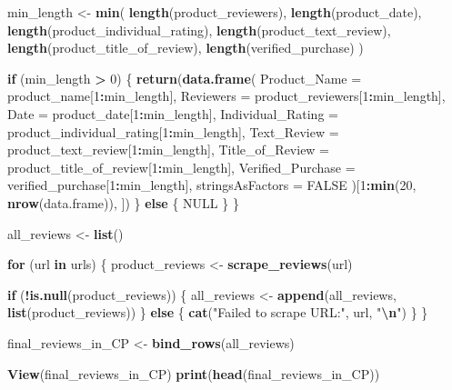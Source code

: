 \documentclass[
  11pt,
]{article}
\newenvironment{Shaded}{\begin{snugshade}}{\end{snugshade}}
\newcommand{\AttributeTok}[1]{\textcolor[rgb]{0.13,0.29,0.53}{#1}}
\newcommand{\ConstantTok}[1]{\textcolor[rgb]{0.56,0.35,0.01}{#1}}
\newcommand{\ControlFlowTok}[1]{\textcolor[rgb]{0.13,0.29,0.53}{\textbf{#1}}}
\newcommand{\DecValTok}[1]{\textcolor[rgb]{0.00,0.00,0.81}{#1}}
\newcommand{\FunctionTok}[1]{\textcolor[rgb]{0.13,0.29,0.53}{\textbf{#1}}}
\newcommand{\NormalTok}[1]{#1}
\newcommand{\OtherTok}[1]{\textcolor[rgb]{0.56,0.35,0.01}{#1}}
\newcommand{\SpecialCharTok}[1]{\textcolor[rgb]{0.81,0.36,0.00}{\textbf{#1}}}
\newcommand{\StringTok}[1]{\textcolor[rgb]{0.31,0.60,0.02}{#1}}
\begin{document}
\begin{Shaded}
\begin{Highlighting}[]
\NormalTok{  min\_length }\OtherTok{\textless{}{-}} \FunctionTok{min}\NormalTok{(}
    \FunctionTok{length}\NormalTok{(product\_reviewers),}
    \FunctionTok{length}\NormalTok{(product\_date),}
    \FunctionTok{length}\NormalTok{(product\_individual\_rating),}
    \FunctionTok{length}\NormalTok{(product\_text\_review),}
    \FunctionTok{length}\NormalTok{(product\_title\_of\_review),}
    \FunctionTok{length}\NormalTok{(verified\_purchase)}
\NormalTok{  )}
  
  \ControlFlowTok{if}\NormalTok{ (min\_length }\SpecialCharTok{\textgreater{}} \DecValTok{0}\NormalTok{) \{}
    \FunctionTok{return}\NormalTok{(}\FunctionTok{data.frame}\NormalTok{(}
      \AttributeTok{Product\_Name =}\NormalTok{ product\_name[}\DecValTok{1}\SpecialCharTok{:}\NormalTok{min\_length],}
      \AttributeTok{Reviewers =}\NormalTok{ product\_reviewers[}\DecValTok{1}\SpecialCharTok{:}\NormalTok{min\_length],}
      \AttributeTok{Date =}\NormalTok{ product\_date[}\DecValTok{1}\SpecialCharTok{:}\NormalTok{min\_length],}
      \AttributeTok{Individual\_Rating =}\NormalTok{ product\_individual\_rating[}\DecValTok{1}\SpecialCharTok{:}\NormalTok{min\_length],}
      \AttributeTok{Text\_Review =}\NormalTok{ product\_text\_review[}\DecValTok{1}\SpecialCharTok{:}\NormalTok{min\_length],}
      \AttributeTok{Title\_of\_Review =}\NormalTok{ product\_title\_of\_review[}\DecValTok{1}\SpecialCharTok{:}\NormalTok{min\_length],}
      \AttributeTok{Verified\_Purchase =}\NormalTok{ verified\_purchase[}\DecValTok{1}\SpecialCharTok{:}\NormalTok{min\_length],}
      \AttributeTok{stringsAsFactors =} \ConstantTok{FALSE}
\NormalTok{    )[}\DecValTok{1}\SpecialCharTok{:}\FunctionTok{min}\NormalTok{(}\DecValTok{20}\NormalTok{, }\FunctionTok{nrow}\NormalTok{(data.frame)), ])}
\NormalTok{  \} }\ControlFlowTok{else}\NormalTok{ \{}
    \ConstantTok{NULL}
\NormalTok{  \}}
\NormalTok{\}}


\NormalTok{all\_reviews }\OtherTok{\textless{}{-}} \FunctionTok{list}\NormalTok{()}

\ControlFlowTok{for}\NormalTok{ (url }\ControlFlowTok{in}\NormalTok{ urls) \{}
\NormalTok{  product\_reviews }\OtherTok{\textless{}{-}} \FunctionTok{scrape\_reviews}\NormalTok{(url)}
  
  \ControlFlowTok{if}\NormalTok{ (}\SpecialCharTok{!}\FunctionTok{is.null}\NormalTok{(product\_reviews)) \{}
\NormalTok{    all\_reviews }\OtherTok{\textless{}{-}} \FunctionTok{append}\NormalTok{(all\_reviews, }\FunctionTok{list}\NormalTok{(product\_reviews))}
\NormalTok{  \} }\ControlFlowTok{else}\NormalTok{ \{}
    \FunctionTok{cat}\NormalTok{(}\StringTok{"Failed to scrape URL:"}\NormalTok{, url, }\StringTok{"}\SpecialCharTok{\textbackslash{}n}\StringTok{"}\NormalTok{)}
\NormalTok{  \}}
\NormalTok{\}}


\NormalTok{final\_reviews\_in\_CP }\OtherTok{\textless{}{-}} \FunctionTok{bind\_rows}\NormalTok{(all\_reviews)}


\FunctionTok{View}\NormalTok{(final\_reviews\_in\_CP)}
\FunctionTok{print}\NormalTok{(}\FunctionTok{head}\NormalTok{(final\_reviews\_in\_CP))}
\end{Highlighting}
\end{Shaded}
\end{document}
